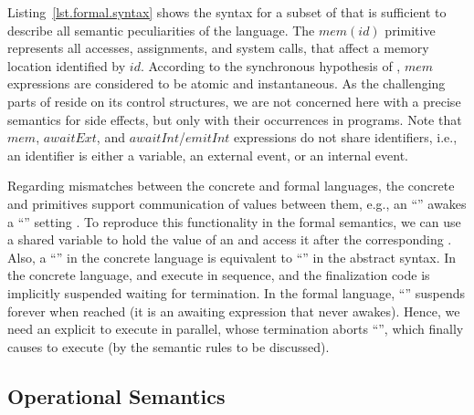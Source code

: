 Listing~\ref{lst.formal.syntax} shows the syntax for a subset of \CEU that is 
sufficient to describe all semantic peculiarities of the language.
%
The $mem(id)$ primitive represents all accesses, assignments, and system calls,
that affect a memory location identified by $id$.
%
According to the synchronous hypothesis of \CEU, $mem$ expressions are 
considered to be atomic and instantaneous.
%
As the challenging parts of \CEU reside on its control structures, we are not 
concerned here with a precise semantics for side effects, but only with their 
occurrences in programs.
%
%
Note that $mem$, $awaitExt$, and $awaitInt$/$emitInt$ expressions do not
share identifiers, i.e., an identifier is either a variable, an external event,
or an internal event.

Regarding mismatches between the concrete and formal languages, the concrete
 and  primitives support communication of values between
them, e.g., an ``'' awakes a ``'' setting
.
To reproduce this functionality in the formal semantics, we can use a shared
variable to hold the value of an  and access it after the
corresponding .
%
Also, a ``'' in the concrete language is
equivalent to ``'' in the abstract syntax.
In the concrete language,  and  execute in sequence, and
the finalization code  is implicitly suspended waiting for 
termination.
In the formal language, ``'' suspends forever when reached (it is
an awaiting expression that never awakes).
Hence, we need an explicit  to execute  in parallel, whose
termination aborts ``'', which finally causes  to
execute (by the semantic rules to be discussed).

\subsection{Operational Semantics}

